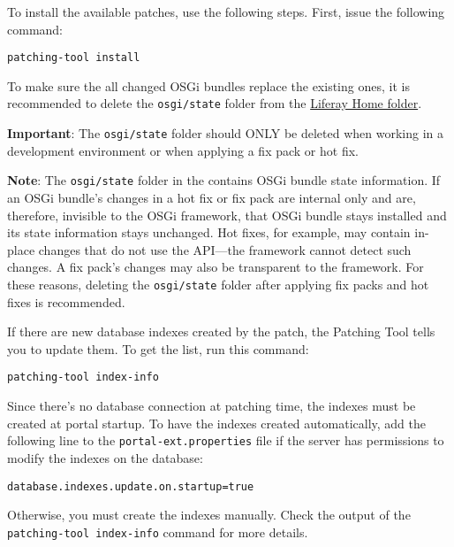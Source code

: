 To install the available patches, use the following steps. First, issue
the following command:

\begin{verbatim}
patching-tool install
\end{verbatim}

To make sure the all changed OSGi bundles replace the existing ones, it
is recommended to delete the \texttt{osgi/state} folder from the
\href{/docs/7-0/deploy/-/knowledge_base/d/installing-product\#liferay-home}{Liferay
Home folder}.

\noindent\hrulefill

\textbf{Important}: The \texttt{osgi/state} folder should ONLY be
deleted when working in a development environment or when applying a fix
pack or hot fix.

\noindent\hrulefill

\noindent\hrulefill

\textbf{Note}: The \texttt{osgi/state} folder in the contains OSGi
bundle state information. If an OSGi bundle's changes in a hot fix or
fix pack are internal only and are, therefore, invisible to the OSGi
framework, that OSGi bundle stays installed and its state information
stays unchanged. Hot fixes, for example, may contain in-place changes
that do not use the API---the framework cannot detect such changes. A
fix pack's changes may also be transparent to the framework. For these
reasons, deleting the \texttt{osgi/state} folder after applying fix
packs and hot fixes is recommended.

\noindent\hrulefill

If there are new database indexes created by the patch, the Patching
Tool tells you to update them. To get the list, run this command:

\begin{verbatim}
patching-tool index-info
\end{verbatim}

Since there's no database connection at patching time, the indexes must
be created at portal startup. To have the indexes created automatically,
add the following line to the \texttt{portal-ext.properties} file if the
server has permissions to modify the indexes on the database:

\begin{verbatim}
database.indexes.update.on.startup=true
\end{verbatim}

Otherwise, you must create the indexes manually. Check the output of the
\texttt{patching-tool\ index-info} command for more details.

